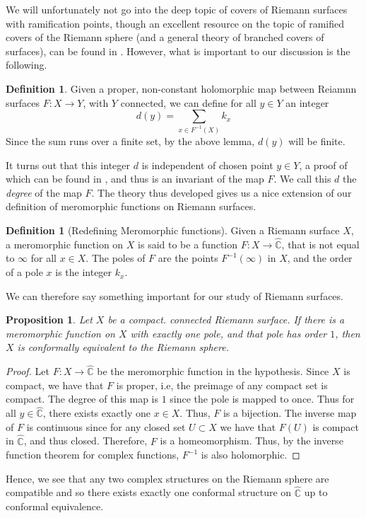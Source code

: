 \documentclass[11pt]{report}
\newtheorem{prop}[thm]{Proposition}
\theoremstyle{definition}
\newtheorem{defn}[thm]{Definition}
\begin{document}
We will unfortunately not go into the deep topic of covers of Riemann surfaces with ramification points, though an excellent resource on the topic of ramified covers of the Riemann sphere (and a general theory of branched covers of surfaces), can be found in \cite{algebra}. However, what is important to our discussion is the following.
\begin{defn}
  Given a proper, non-constant holomorphic map between Reiamnn surfaces $F:X \rightarrow Y$, with $Y$ connected, we can define for all $y\in Y$ an integer \[
    d(y) = \sum\limits_{x \in F^{-1}(X)}k_x
  \]
  Since the sum runs over a finite set, by the above lemma, $d(y)$ will be finite.  
\end{defn}
It turns out that this integer $d$ is independent of chosen point $y \in Y$, a proof of which can be found in \cite[(p.44, Proposition 7)]{donaldson}, and thus is an invariant of the map $F$. We call this $d$ the \emph{degree} of the map $F$. The theory thus developed gives us a nice extension of our definition of meromorphic functions on Riemann surfaces.
\begin{defn}[Redefining Meromorphic functions]
  Given a Riemann surface $X$, a meromorphic function on $X$ is said to be a function $F:X\rightarrow \widehat{\mathbb{C}}$, that is not equal to $\infty$ for all $x \in X$. The poles of $F$ are the points $F^{-1}(\infty)$ in $X$, and the order of a pole $x$ is the integer $k_x$. 
\end{defn}
We can therefore say something important for our study of Riemann surfaces.
\begin{prop}
  Let $X$ be a compact. connected Riemann surface. If there is a meromorphic function on $X$ with exactly one pole, and that pole has order $1$, then $X$ is conformally equivalent to the Riemann sphere.
\end{prop}
\begin{proof}
  Let $F:X \rightarrow \widehat{\mathbb{C}}$ be the meromorphic function in the hypothesis. Since $X$ is compact, we have that $F$ is proper, i.e, the preimage of any compact set is compact. The degree of this map is $1$ since the pole is mapped to once. Thus for all $y \in \widehat{\mathbb{C}}$, there exists exactly one $x \in X$. Thus, $F$ is a bijection. The inverse map of $F$ is continuous since for any closed set $U \subset X$ we have that $F(U)$ is compact in $\widehat{\mathbb{C}}$, and thus closed. Therefore, $F$ is a homeomorphism. Thus, by the inverse function theorem for complex functions, $F^{-1}$ is also holomorphic. 
\end{proof}
Hence, we see that any two complex structures on the Riemann sphere are compatible and so there exists exactly one conformal structure on $\widehat{\mathbb{C}}$ up to conformal equivalence.
\end{document}
